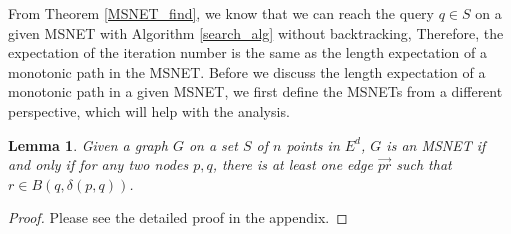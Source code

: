 \documentclass{vldb}
\newtheorem{lemma}{Lemma}
\begin{document}
From Theorem \ref{MSNET_find}, we know that we can reach the query $q\in S$ on a given MSNET with Algorithm \ref{search_alg} without backtracking, Therefore, the expectation of the iteration number is the same as the length expectation of a monotonic path in the MSNET. Before we discuss the length expectation of a monotonic path in a given MSNET, we first define the MSNETs from a different perspective, which will help with the analysis. 



\begin{lemma}
\label{NewDefMSNET}
Given a graph $G$ on a set $S$ of $n$ points in $E^d$, $G$ is an MSNET if and only if for any two nodes $p,q$, there is at least one edge $\overset{\longrightarrow}{pr}$ such that $r \in B(q, \delta(p,q))$. 
\end{lemma}
\begin{proof}
Please see the detailed proof in the appendix.
\end{proof}
\end{document}
